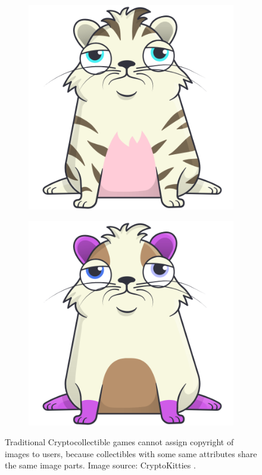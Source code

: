 \documentclass[b5paper]{article}
\begin{document}
\begin{figure}[!h]
\begin{subfigure}{0.5\textwidth}
  \includegraphics[width=\textwidth]{870796.png}
\end{subfigure}\hspace*{\fill}
\begin{subfigure}{0.5\textwidth}
  \includegraphics[width=\textwidth]{871240.png}
\end{subfigure}

\caption{
Traditional Cryptocollectible games cannot assign copyright of images to users, because collectibles with some same attributes share the same image parts. Image source: CryptoKitties \cite{cryptokitties}.
}
\end{figure}
\end{document}
